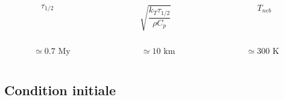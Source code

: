 \documentclass{beamer}
\begin{document}
\begin{frame}
\vspace{0.5cm}

\begin{columns}
    \begin{column}{4cm}
      $$\tau_{1/2}$$
	\end{column}

	\begin{column}{4cm}
      $$\sqrt{\dfrac{k_T\tau_{1/2}}{\rho C_p}}$$
	\end{column}
	
	\begin{column}{4cm}
      $$T_{neb}$$     
	\end{column}
\end{columns}

\vspace{0.5cm}

\begin{columns}
    \begin{column}{4cm}
      $$\simeq 0.7 \text{ My}$$
	\end{column}

	\begin{column}{4cm}
      $$\simeq 10\text{ km}$$
	\end{column}
	
	\begin{column}{4cm}
      $$\simeq 300 \text{ K}$$       
	\end{column}
\end{columns}
	
\end{frame}

\subsection{Condition initiale}
\end{document}
